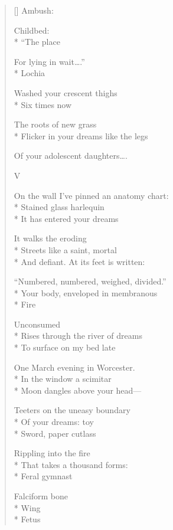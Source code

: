 \begin{verse}[\versewidth]
Ambush:

Childbed:\\*
 \qquad ``The place

For lying in wait\ldots .''\\*
Lochia

Washed your crescent thighs\\*
Six times \qquad now

The roots of new grass\\*
Flicker in your dreams like the legs

Of your adolescent daughters\ldots .

                                    V

On the wall I've pinned an anatomy chart: \\*
Stained glass harlequin\\*
It has entered your dreams

It walks the eroding \\*
Streets   like a saint, mortal\\*
And defiant. \qquad At its feet is written:

``Numbered, numbered, weighed, divided.''\\*
Your body, enveloped in membranous\\*
Fire

Unconsumed\\*
Rises through the river of dreams\\*
To surface on my bed late

One March evening in Worcester.\\*
In the window a scimitar \\*
Moon dangles above your head---

Teeters on the uneasy boundary\\*
Of your dreams: toy\\*
Sword, paper cutlass

Rippling into the fire\\*
That takes a thousand forms:\\*
Feral gymnast

Falciform bone\\*
Wing\\*
Fetus
\end{verse}
